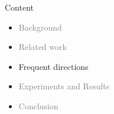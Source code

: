 \documentclass[first=dgreen,second=purple,logo=redque]{aaltoslides}
\newcommand{\vectornorm}[1]{\left\|#1\right\|}
\begin{document}

%

%


\begin{frame}{Content}
\begin{itemize}
\item \textcolor{gray}{Background}
\item \textcolor{gray}{Related work}
\item Frequent directions
\item \textcolor{gray}{Experiments and Results}
\item \textcolor{gray}{Conclusion}
\end{itemize}
\end{frame}
\end{document}
